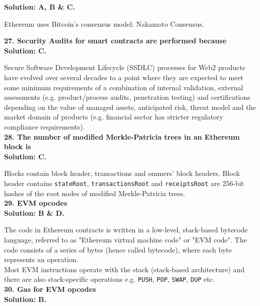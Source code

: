 \textbf{Solution: A, B \& C.}

Ethereum uses Bitcoin's consensus model: Nakamoto Consensus.\\

\pagebreak

\textbf{27. Security Audits for smart contracts are performed because}\label{sec:exam1_q27}\\

\textbf{Solution: C.}

Secure Software Development Lifecycle (SSDLC) processes for Web2 products have evolved over several decades to a point where they are expected to meet some minimum requirements of a combination of internal validation, external assessments (e.g. product/process audits, penetration testing) and certifications depending on the value of managed assets, anticipated risk, threat model and the market domain of products (e.g. financial sector has stricter regulatory compliance requirements).\\

\textbf{28. The number of modified Merkle-Patricia trees in an Ethereum block is}\label{sec:exam1_q28}\\

\textbf{Solution: C.}

Blocks contain block header, transactions and ommers' block headers.
Block header contains \verb|stateRoot|, \verb|transactionsRoot| and \verb|receiptsRoot| are 256-bit hashes of the root nodes of modified Merkle-Patricia trees.\\

\textbf{29. EVM opcodes}\label{sec:exam1_q29}\\

\textbf{Solution: B \& D.}

The code in Ethereum contracts is written in a low-level, stack-based bytecode language, referred to as "Ethereum virtual machine code" or "EVM code".
The code consists of a series of bytes (hence called bytecode), where each byte represents an operation.\\

Most EVM instructions operate with the stack (stack-based architecture) and there are also stack-specific operations e.g. \verb|PUSH|, \verb|POP|, \verb|SWAP|, \verb|DUP| etc.\\

\textbf{30. Gas for EVM opcodes}\label{sec:exam1_q30}\\

\textbf{Solution: B.}

